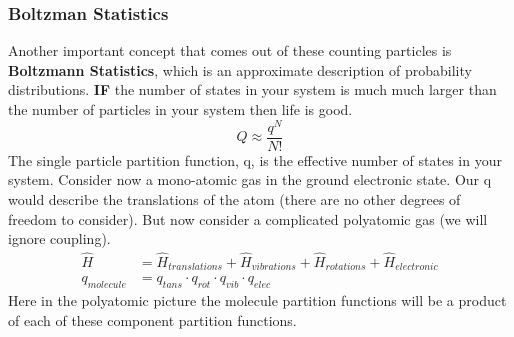 \documentclass{article}
\begin{document}
\subsubsection*{Boltzman Statistics}
Another important concept that comes out of these counting particles is \textbf{Boltzmann Statistics}, which is an approximate description of probability distributions. \textbf{IF} the number of states in your system is much much larger than the number of particles in your system then life is good. 
\begin{equation}
Q \approx \frac{q^N}{N!}
\end{equation}
The single particle partition function, q, is the effective number of states in your system. 
Consider now a mono-atomic gas in the ground electronic state. 
Our q would describe the translations of the atom (there are no other degrees of freedom to consider). 
But now consider a complicated polyatomic gas (we will ignore coupling).
\begin{equation}
\begin{split}
\hat{H} &= \hat{H}_{translations} + \hat{H}_{vibrations} + \hat{H}_{rotations} + \hat{H}_{electronic}\\
q_{molecule} &= q_{tans} \cdot q_{rot} \cdot q_{vib} \cdot q_{elec}
\end{split}
\end{equation}
Here in the polyatomic picture the molecule partition functions will be a product of each of these component partition functions. 
\end{document}
